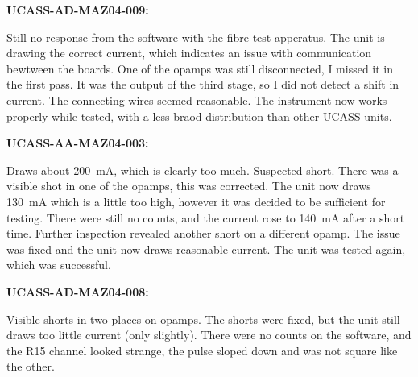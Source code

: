 

\textbf{UCASS-AD-MAZ04-009:}

Still no response from the software with the fibre-test apperatus. The unit is drawing the correct current, which indicates an issue with communication bewtween the boards. One of the opamps was still disconnected, I missed it in the first pass. It was the output of the third stage, so I did not detect a shift in current. The connecting wires seemed reasonable. The instrument now works properly while tested, with a less braod distribution than other UCASS units.

\textbf{UCASS-AA-MAZ04-003:}

Draws about \SI{200}{\milli\ampere}, which is clearly too much. Suspected short. There was a visible shot in one of the opamps, this was corrected. The unit now draws \SI{130}{\milli\ampere} which is a little too high, however it was decided to be sufficient for testing. There were still no counts, and the current rose to \SI{140}{\milli\ampere} after a short time. Further inspection revealed another short on a different opamp. The issue was fixed and the unit now draws reasonable current. The unit was tested again, which was successful.

\textbf{UCASS-AD-MAZ04-008:}

Visible shorts in two places on opamps. The shorts were fixed, but the unit still draws too little current (only slightly). There were no counts on the software, and the R15 channel looked strange, the pulse sloped down and was not square like the other.

